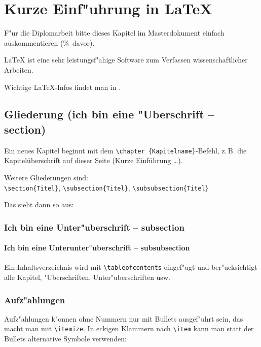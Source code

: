 \chapter{Kurze Einf"uhrung in \LaTeX}
    F"ur die Diplomarbeit bitte dieses Kapitel im Masterdokument
    einfach auskommentieren (\%~davor).

	\LaTeX{} ist eine sehr leistungsf"ahige Software zum Verfassen wissenschaftlicher Arbeiten.

	Wichtige \LaTeX{}-Infos findet man in \cite{l2kurz}.

	\section{Gliederung (ich bin eine "Uberschrift -- section)}
	Ein neues Kapitel beginnt mit dem \verb|\chapter {Kapitelname}|-Befehl, z.\,B. die Kapitelüberschrift auf dieser Seite (Kurze Einführung \dots).

	Weitere Gliederungen sind:\\
	\verb|\section{Titel}|, \verb|\subsection{Titel}|,
	\verb|\subsubsection{Titel}|

	Das sieht dann so aus:


	\subsection{Ich bin eine Unter"uberschrift -- subsection}

		\subsubsection{Ich bin eine Unterunter"uberschrift -- subsubsection}

		Ein Inhaltsverzeichnis wird mit \verb|\tableofcontents| eingef"ugt und ber"ucksichtigt alle Kapitel, "Uberschriften, Unter"uberschriften usw.

	\subsection{Aufz"ahlungen}
		Aufz"ahlungen k"onnen ohne Nummern nur mit Bullets ausgef"uhrt sein, das macht man mit \verb|\itemize|. In eckigen Klammern nach \verb|\item| kann man statt der Bullets alternative Symbole verwenden:

